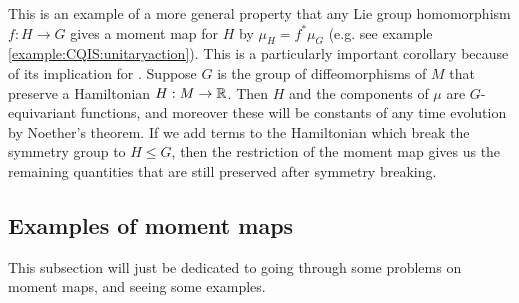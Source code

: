 \documentclass{article}
\begin{document}
\begin{remark}
This is an example of a more general property that any Lie group homomorphism $f : H \to G$ gives a moment map for $H$ by $\mu_H = f^\ast \mu_G$ (e.g. see example \ref{example:CQIS:unitaryaction}). This is a particularly important corollary because of its implication for . Suppose $G$ is the group of diffeomorphisms of $M$ that preserve a Hamiltonian $H:M \to \mathbb{R}$. Then $H$ and the components of $\mu$ are $G$-equivariant functions, and moreover these will be constants of any time evolution by Noether's theorem. If we add terms to the Hamiltonian which break the symmetry group to $H \leq G$, then the restriction of the moment map gives us the remaining quantities that are still preserved after symmetry breaking.  
\end{remark}
\subsection{Examples of moment maps}
This subsection will just be dedicated to going through some problems on moment maps, and seeing some examples. 
\end{document}
